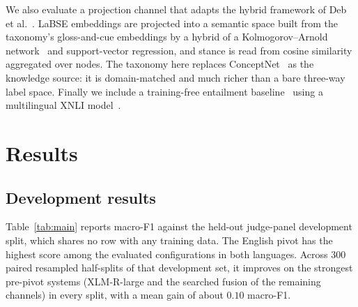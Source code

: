 \documentclass{ceurart}
\begin{document}
We also evaluate a projection channel that adapts the hybrid framework of
Deb et al.~\cite{deb2026}. LaBSE embeddings are projected into a semantic
space built from the taxonomy's gloss-and-cue embeddings by a hybrid of a
Kolmogorov--Arnold network~\cite{liu2025kan} and support-vector regression,
and stance is read from cosine similarity aggregated over nodes. The
taxonomy here replaces ConceptNet~\cite{speer2017} as the knowledge source:
it is domain-matched and much richer than a bare three-way label space.
Finally we include a training-free entailment baseline~\cite{yin2019} using
a multilingual XNLI model~\cite{conneau2018xnli}.

\section{Results}
\label{sec:results}

\subsection{Development results}
\label{sec:devresults}

Table~\ref{tab:main} reports macro-F1 against the held-out judge-panel
development split, which shares no row with any training data. The English
pivot has the highest score among the evaluated configurations in both
languages. Across 300 paired resampled half-splits of that development set,
it improves on the strongest pre-pivot systems (XLM-R-large and the searched
fusion of the remaining channels) in every split, with a mean gain of about
$0.10$ macro-F1.
\end{document}
